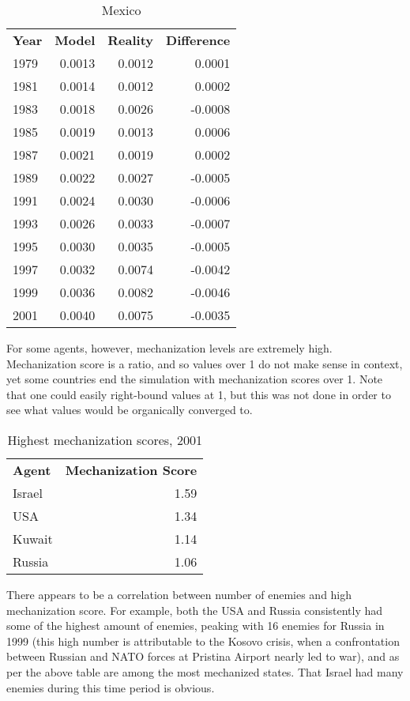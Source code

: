 \documentclass{article}
\begin{document}
\begin{table}[h]
	\centering
	\caption{Mexico}
	\begin{tabular}{|l r r r|}
		\hline
		\textbf{Year} & \textbf{Model} & \textbf{Reality} & \textbf{Difference}\\
		1979 & 0.0013 & 0.0012 & 0.0001  \\
		1981 & 0.0014 & 0.0012 & 0.0002  \\
		1983 & 0.0018 & 0.0026 & -0.0008 \\
		1985 & 0.0019 & 0.0013 & 0.0006  \\
		1987 & 0.0021 & 0.0019 & 0.0002  \\
		1989 & 0.0022 & 0.0027 & -0.0005 \\
		1991 & 0.0024 & 0.0030 & -0.0006 \\
		1993 & 0.0026 & 0.0033 & -0.0007 \\
		1995 & 0.0030 & 0.0035 & -0.0005 \\
		1997 & 0.0032 & 0.0074 & -0.0042 \\
		1999 & 0.0036 & 0.0082 & -0.0046 \\
		2001 & 0.0040 & 0.0075 & -0.0035 \\
		\hline
	\end{tabular}
\end{table}

For some agents, however, mechanization levels are extremely high. 
Mechanization score is a ratio, and so values over 1 do not make sense in
context, 
yet some countries end the simulation with mechanization scores over 1. Note
that one could easily right-bound values at 1, but this was not done in order to
see what values would be organically converged to.

\begin{table}[h]
	\centering
	\caption{Highest mechanization scores, 2001}
	\begin{tabular}{|l r|}
		\hline
		\textbf{Agent} & \textbf{Mechanization Score} \\
		Israel & 1.59 \\
		USA & 1.34 \\
		Kuwait & 1.14 \\
		Russia & 1.06 \\
		\hline
	\end{tabular}
\end{table}

There appears to be a correlation between number of enemies and high
mechanization score. For example, both the USA and Russia consistently had some
of the highest amount of enemies, peaking with 16 enemies for Russia in 1999
(this high number is attributable to the Kosovo crisis, when a confrontation between Russian and NATO forces
at Pristina Airport nearly led to war), and as per the above table are among the
most mechanized states. That Israel had many enemies during this time period is
obvious. 
\end{document}
